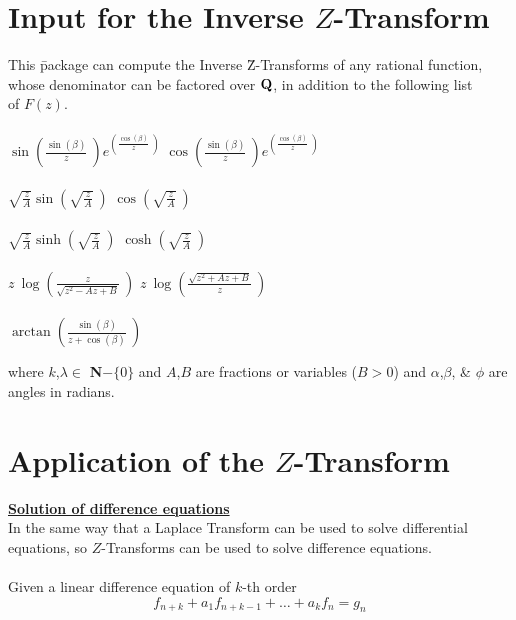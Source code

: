 \section{Input for the Inverse $Z$-Transform}
\begin{tabbing}
  This \= package can compute the Inverse \= Z-Transforms of any
  rational function, \\ whose denominator can be factored over
  ${\bf Q}$, in addition to the following list \\ of $F(z)$.\\ \\

\> $\sin \left(\frac{\sin (\beta)}{z} \ \right)
    e^{\left(\frac{\cos (\beta)}{z} \ \right)}$
\> $\cos \left(\frac{\sin (\beta)}{z} \ \right)
    e^{\left(\frac{\cos (\beta)}{z} \ \right)}$ \\ \\
\> $\sqrt{\frac{z}{A}} \sin \left( \sqrt{\frac{z}{A}} \ \right)$
\> $\cos \left( \sqrt{\frac{z}{A}} \ \right)$ \\ \\
\> $\sqrt{\frac{z}{A}} \sinh \left( \sqrt{\frac{z}{A}} \ \right)$
\> $\cosh \left( \sqrt{\frac{z}{A}} \ \right)$ \\ \\
\> $z \ \log \left(\frac{z}{\sqrt{z^2-A z+B}} \ \right)$
\> $z \ \log \left(\frac{\sqrt{z^2+A z+B}}{z} \ \right)$ \\ \\
\> $\arctan \left(\frac{\sin (\beta)}{z+\cos (\beta)} \ \right)$
\\
\end{tabbing}

  where $k$,$\lambda \in$ {\bf N}$ -  \{0\}$ and $A$,$B$ are fractions
  or variables ($B>0$) and $\alpha$,$\beta$, \&  $\phi$ are angles
  in radians.

\section{Application of the $Z$-Transform}
\underline {{\bf Solution of difference equations}}\\

  In the same way that a Laplace Transform can be used to
  solve differential equations, so $Z$-Transforms can be used
  to solve difference equations.\\ \\
  Given a linear difference equation of $k$-th order
\begin{equation}
  f_{n+k} + a_1 f_{n+k-1}+ \ldots + a_k f_n = g_n
\label{eq:1}
\end{equation}

